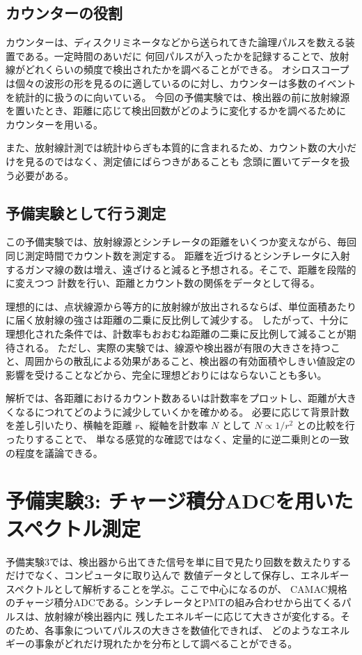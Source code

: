 \documentclass[uplatex,dvipdfmx,12pt,nomag]{jsarticle}
\begin{document}
\subsection{カウンターの役割}

カウンターは、ディスクリミネータなどから送られてきた論理パルスを数える装置である。一定時間のあいだに
何回パルスが入ったかを記録することで、放射線がどれくらいの頻度で検出されたかを調べることができる。
オシロスコープは個々の波形の形を見るのに適しているのに対し、カウンターは多数のイベントを統計的に扱うのに向いている。
今回の予備実験では、検出器の前に放射線源を置いたとき、距離に応じて検出回数がどのように変化するかを調べるために
カウンターを用いる。

また、放射線計測では統計ゆらぎも本質的に含まれるため、カウント数の大小だけを見るのではなく、測定値にばらつきがあることも
念頭に置いてデータを扱う必要がある。

\subsection{予備実験として行う測定}

この予備実験では、放射線源とシンチレータの距離をいくつか変えながら、毎回同じ測定時間でカウント数を測定する。
距離を近づけるとシンチレータに入射するガンマ線の数は増え、遠ざけると減ると予想される。そこで、距離を段階的に変えつつ
計数を行い、距離とカウント数の関係をデータとして得る。

理想的には、点状線源から等方的に放射線が放出されるならば、単位面積あたりに届く放射線の強さは距離の二乗に反比例して減少する。
したがって、十分に理想化された条件では、計数率もおおむね距離の二乗に反比例して減ることが期待される。
ただし、実際の実験では、線源や検出器が有限の大きさを持つこと、周囲からの散乱による効果があること、検出器の有効面積やしきい値設定の
影響を受けることなどから、完全に理想どおりにはならないことも多い。

解析では、各距離におけるカウント数あるいは計数率をプロットし、距離が大きくなるにつれてどのように減少していくかを確かめる。
必要に応じて背景計数を差し引いたり、横軸を距離 $r$、縦軸を計数率 $N$ として $N \propto 1/r^2$ との比較を行ったりすることで、
単なる感覚的な確認ではなく、定量的に逆二乗則との一致の程度を議論できる。

\section{予備実験3: チャージ積分ADCを用いたスペクトル測定}

予備実験3では、検出器から出てきた信号を単に目で見たり回数を数えたりするだけでなく、コンピュータに取り込んで
数値データとして保存し、エネルギースペクトルとして解析することを学ぶ。ここで中心になるのが、
CAMAC規格のチャージ積分ADCである。シンチレータとPMTの組み合わせから出てくるパルスは、放射線が検出器内に
残したエネルギーに応じて大きさが変化する。そのため、各事象についてパルスの大きさを数値化できれば、
どのようなエネルギーの事象がどれだけ現れたかを分布として調べることができる。
\end{document}
